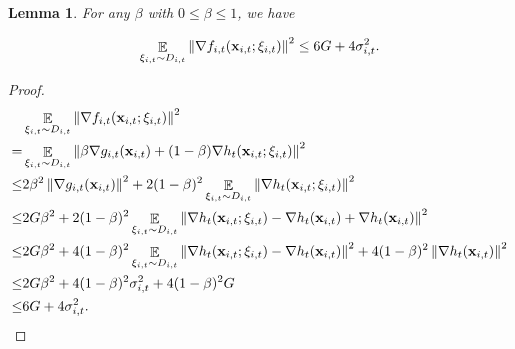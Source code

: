 \documentclass{article}
\newtheorem{Lemma}{\bf{Lemma}}
\begin{document}
\begin{Lemma}
\label{lemma_stochastic_gradient_norm_bound}
For any $\beta$ with $0\le \beta \le 1$, we have 

\begin{align}
\nonumber
\mathop{\mathbb{E}}_{ \xi_{i,t} \sim D_{i,t} }\left\lVert \nabla f_{i,t}({\bf x}_{i,t};\xi_{i,t})\right\rVert^2 \le 6G  + 4 \sigma_{i,t}^2.
\end{align}


\end{Lemma}
\begin{proof}

\begin{align}
\nonumber
& \mathop{\mathbb{E}}_{ \xi_{i,t} \sim D_{i,t} }\left\lVert \nabla f_{i,t}({\bf x}_{i,t};\xi_{i,t})\right\rVert^2 \\ \nonumber 
= & \mathop{\mathbb{E}}_{ \xi_{i,t} \sim D_{i,t} }\left\lVert \beta \nabla g_{i,t}({\bf x}_{i,t}) + (1-\beta)\nabla h_t({\bf x}_{i,t};\xi_{i,t})\right\rVert^2 \\ \nonumber 
\le &  2\beta^2 \left\lVert \nabla g_{i,t}({\bf x}_{i,t}) \right\rVert^2 + 2(1-\beta)^2 \mathop{\mathbb{E}}_{ \xi_{i,t} \sim D_{i,t} } \left\lVert \nabla h_t({\bf x}_{i,t};\xi_{i,t}) \right\rVert^2 \\ \nonumber 
\le & 2G\beta^2  + 2(1-\beta)^2 \mathop{\mathbb{E}}_{ \xi_{i,t} \sim D_{i,t} }\left\lVert \nabla h_t({\bf x}_{i,t};\xi_{i,t}) - \nabla h_t({\bf x}_{i,t}) + \nabla h_t({\bf x}_{i,t})\right\rVert^2 \\ \nonumber 
\le & 2G\beta^2  +  4(1-\beta)^2 \mathop{\mathbb{E}}_{ \xi_{i,t} \sim D_{i,t} }\left\lVert \nabla h_t({\bf x}_{i,t};\xi_{i,t}) - \nabla h_t({\bf x}_{i,t}) \right\rVert^2 +  4(1-\beta)^2 \left\lVert \nabla h_t({\bf x}_{i,t})\right\rVert^2 \\ \nonumber 
\le & 2G\beta^2  + 4(1-\beta)^2 \sigma_{i,t}^2 + 4(1-\beta)^2 G \\ \nonumber 
\le & 6G  + 4 \sigma_{i,t}^2.
\end{align}



\end{proof}
\end{document}
